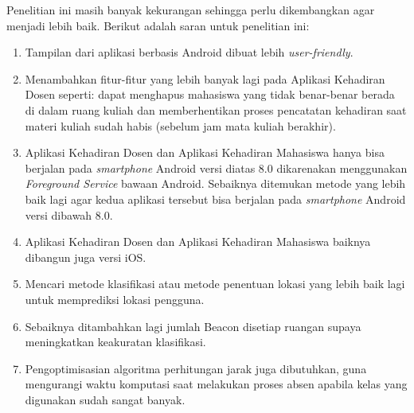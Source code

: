 	Penelitian ini masih banyak kekurangan sehingga perlu dikembangkan agar menjadi lebih baik. Berikut adalah saran untuk penelitian ini:
	\begin{enumerate}
		\item Tampilan dari aplikasi berbasis Android dibuat lebih \textit{user-friendly}.
		\item Menambahkan fitur-fitur yang lebih banyak lagi pada Aplikasi Kehadiran Dosen seperti: dapat menghapus mahasiswa yang tidak benar-benar berada di dalam ruang kuliah dan memberhentikan proses pencatatan kehadiran saat materi kuliah sudah habis (sebelum jam mata kuliah berakhir).
		\item Aplikasi Kehadiran Dosen dan Aplikasi Kehadiran Mahasiswa hanya bisa berjalan pada \textit{smartphone} Android versi diatas 8.0 dikarenakan menggunakan \textit{Foreground Service} bawaan Android. Sebaiknya ditemukan metode yang lebih baik lagi agar kedua aplikasi tersebut bisa berjalan pada \textit{smartphone} Android versi dibawah 8.0.
		\item Aplikasi Kehadiran Dosen dan Aplikasi Kehadiran Mahasiswa baiknya dibangun juga  versi iOS.
		\item Mencari metode klasifikasi atau metode penentuan lokasi yang lebih baik lagi untuk memprediksi lokasi pengguna.
		\item Sebaiknya ditambahkan lagi jumlah Beacon disetiap ruangan supaya meningkatkan keakuratan klasifikasi.
		\item Pengoptimisasian algoritma perhitungan jarak juga dibutuhkan, guna mengurangi waktu komputasi saat melakukan proses absen apabila kelas yang digunakan sudah sangat banyak.
	\end{enumerate}

\fancyhf{} 
\fancyfoot[R]{\thepage}

\begin{comment}

\end{comment}
